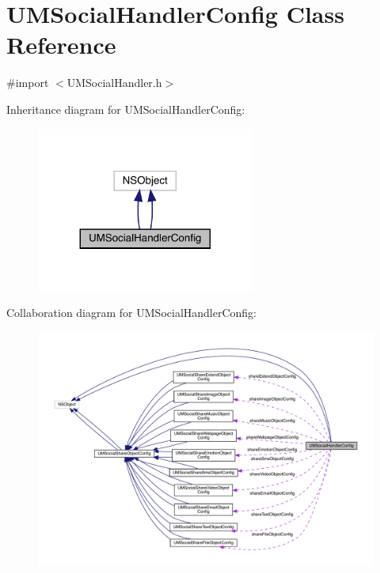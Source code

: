 \hypertarget{interface_u_m_social_handler_config}{}\section{U\+M\+Social\+Handler\+Config Class Reference}
\label{interface_u_m_social_handler_config}


{\ttfamily \#import $<$U\+M\+Social\+Handler.\+h$>$}



Inheritance diagram for U\+M\+Social\+Handler\+Config\+:\nopagebreak
\begin{figure}[H]
\begin{center}
\leavevmode
\includegraphics[width=203pt]{interface_u_m_social_handler_config__inherit__graph}
\end{center}
\end{figure}


Collaboration diagram for U\+M\+Social\+Handler\+Config\+:\nopagebreak
\begin{figure}[H]
\begin{center}
\leavevmode
\includegraphics[width=350pt]{interface_u_m_social_handler_config__coll__graph}
\end{center}
\end{figure}
